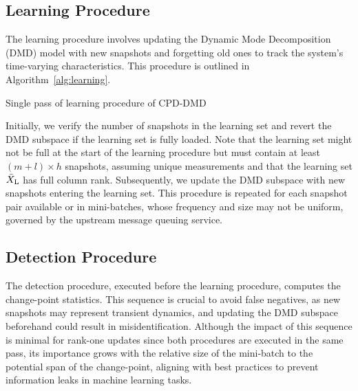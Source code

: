 \subsection{Learning Procedure}\label{learn-cpd}
The learning procedure involves updating the Dynamic Mode Decomposition (DMD) model with new snapshots and forgetting old ones to track the system's time-varying characteristics. This procedure is outlined in Algorithm~\ref{alg:learning}.

\begin{algorithm}
    \caption{Single pass of learning procedure of CPD-DMD}\label{alg:learning}
    \begin{algorithmic}[1]
        \ENDIF{}
    \end{algorithmic}
\end{algorithm}

Initially, we verify the number of snapshots in the learning set and revert the DMD subspace if the learning set is fully loaded. Note that the learning set might not be full at the start of the learning procedure but must contain at least \((m + l) \times h\) snapshots, assuming unique measurements and that the learning set \(\bar{X} _{\text{L}}\) has full column rank. Subsequently, we update the DMD subspace with new snapshots entering the learning set. This procedure is repeated for each snapshot pair available or in mini-batches, whose frequency and size may not be uniform, governed by the upstream message queuing service.

\subsection{Detection Procedure}\label{detect-cpd}
The detection procedure, executed before the learning procedure, computes the change-point statistics. This sequence is crucial to avoid false negatives, as new snapshots may represent transient dynamics, and updating the DMD subspace beforehand could result in misidentification. Although the impact of this sequence is minimal for rank-one updates since both procedures are executed in the same pass, its importance grows with the relative size of the mini-batch to the potential span of the change-point, aligning with best practices to prevent information leaks in machine learning tasks.

